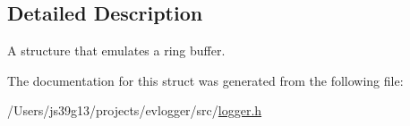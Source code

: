 \subsection{Detailed Description}
A structure that emulates a ring buffer. 

The documentation for this struct was generated from the following file\-:\begin{DoxyCompactItemize}
\item 
/\-Users/js39g13/projects/evlogger/src/\hyperlink{logger_8h}{logger.\-h}\end{DoxyCompactItemize}
